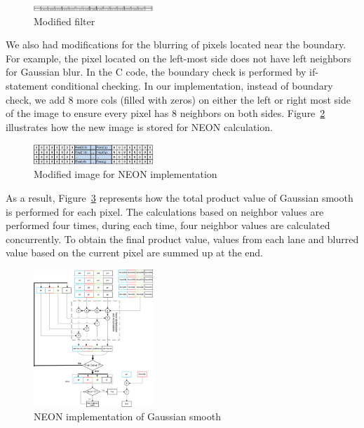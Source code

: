 \begin{figure}
\centering
\includegraphics[width=0.4\textwidth]{drawings/filter}
\caption{Modified filter}
\label{fig:newfilter}
\end{figure}

We also had modifications for the blurring of pixels located near the boundary. For example, the pixel located on the left-most side does not have left neighbors for Gaussian blur. In the C code, the boundary check is performed by if-statement conditional checking. In our implementation, instead of boundary check, we add 8 more cols (filled with zeros) on either the left or right most side of the image to ensure every pixel has 8 neighbors on both sides. Figure~\ref{fig:addcols} illustrates how the new image is stored for NEON calculation. 

\begin{figure}
\centering
\includegraphics[width=0.4\textwidth]{drawings/new_cols}
\caption{Modified image for NEON implementation}
\label{fig:addcols}
\end{figure}

As a result, Figure~\ref{fig:neon} represents how the total product value of Gaussian smooth is performed for each pixel. The calculations based on neighbor values are performed four times, during each time, four neighbor values are calculated concurrently. To obtain the final product value, values from each lane and blurred value based on the current pixel are summed up at the end.

\begin{figure}
\centering
\includegraphics[width=0.4\textwidth]{drawings/neon}
\caption{NEON implementation of Gaussian smooth}
\label{fig:neon}
\end{figure}
